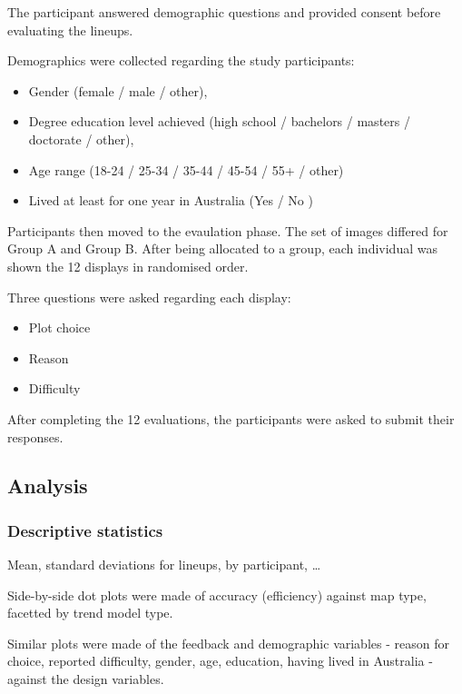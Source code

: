 \documentclass[conference,final,]{IEEEtran}
\providecommand{\tightlist}{%
  \setlength{\itemsep}{0pt}\setlength{\parskip}{0pt}}
\begin{document}
The participant answered demographic questions and provided consent before evaluating the lineups.

Demographics were collected regarding the study participants:

\begin{itemize}
\tightlist
\item
  Gender (female / male / other),
\item
  Degree education level achieved (high school / bachelors / masters / doctorate / other),
\item
  Age range (18-24 / 25-34 / 35-44 / 45-54 / 55+ / other)
\item
  Lived at least for one year in Australia (Yes / No )
\end{itemize}

Participants then moved to the evaulation phase.
The set of images differed for Group A and Group B.
After being allocated to a group, each individual was shown the 12 displays in randomised order.

Three questions were asked regarding each display:

\begin{itemize}
\tightlist
\item
  Plot choice
\item
  Reason
\item
  Difficulty
\end{itemize}

After completing the 12 evaluations, the participants were asked to submit their responses.

\hypertarget{analysis}{%
\subsection{Analysis}\label{analysis}}

\hypertarget{descriptive-statistics}{%
\subsubsection{Descriptive statistics}\label{descriptive-statistics}}

Mean, standard deviations for lineups, by participant, \ldots{}

Side-by-side dot plots were made of accuracy (efficiency) against map type, facetted by trend model type.

Similar plots were made of the feedback and demographic variables - reason for choice, reported difficulty, gender, age, education, having lived in Australia - against the design variables.
\end{document}
